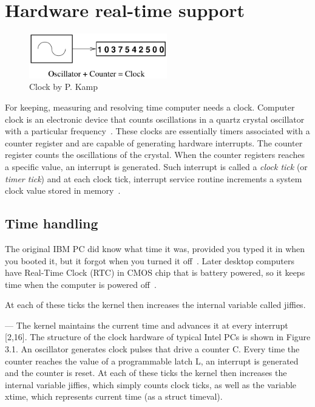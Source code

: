
\chapter{Hardware real-time support}
\begin{figure}
	\centering
	\includegraphics[width=6cm,keepaspectratio]{fig/clock.png}
	\caption{Clock by P. Kamp}
	\label{fig:hw-clock}
\end{figure}
For keeping, measuring and resolving time computer needs a clock.
Computer clock is an electronic device that counts oscillations in a
quartz crystal oscillator with a particular frequency~\cite{thesis-sync}.
These clocks are essentially timers associated with a counter register and
are capable of generating hardware interrupts.
The counter register counts the oscillations of the crystal.
When the counter registers reaches a specific value,
an interrupt is generated.
Such interrupt is called a {\it{clock tick}} (or {\it{timer tick}}) and at each clock tick,
interrupt service routine increments a system clock value stored in memory~\cite{thesis-sync}.

\section{Time handling}
The original IBM PC did know what time it was, provided you typed it in when you booted it,
but it forgot when you turned it off~\cite{timecounters}.
Later desktop computers %
have Real-Time Clock (RTC) in CMOS chip that is battery powered,
so it keeps time when the computer is powered off~\cite{timecounters}.

At each of these ticks the kernel then increases the internal variable called jiffies.

---
The kernel maintains the current time and advances it at every interrupt [2,16].
The structure of the clock hardware of typical Intel PCs is shown in Figure 3.1.
An oscillator generates clock pulses that drive a counter C.
Every time the counter reaches the value of a programmable latch L,
an interrupt is generated and the counter is reset.
At each of these ticks the kernel then increases the internal variable jiffies,
which simply counts clock ticks, as well as the variable xtime,
which represents current time (as a struct timeval).

